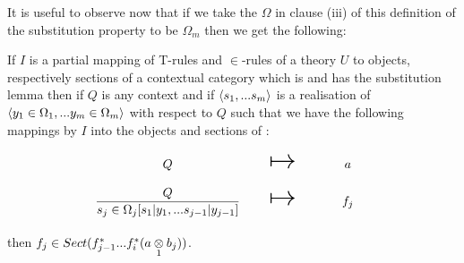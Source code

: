 It is useful to observe now that if we take the  $\Omega$ in clause (iii) of this definition of the substitution property 
to be $\Omega_m$ then we get the following:
\begin{observation}
\label{substitutionpropertyvariant}
\newcommand {\forceSOURCEwidth}{\rule{5cm}{0pt}}  %
\newcommand {\forceTARGETwidth}{\rule{2.2cm}{0pt}}
If $I$ is a partial mapping of T-rules and $\in$-rules of a theory $U$ to objects, respectively sections of a contextual category \catcw
which is  and has the substitution lemma then if $Q$ is any context and if $\tuple{\sm}$ is a realisation of $\tuple{\yOmega{m}}$ with respect to $Q$
such that we have the following mappings by $I$ into the objects and sections of \catc:
\begin{equation*}
\begin{array}{c c c}
\forceSOURCEwidth & & \forceTARGETwidth \\ [-0.1cm]
Q          & \Imapsto & a   \\ [0.4cm]
\sjrule    & \Imapsto & f_j \\ [0.4cm]
\end{array}
\end{equation*}
then $f_j \in Sect(f_{j-1}^*...f_i^*(\crossx{a}{b_j}{1}))$.
\end{observation}


